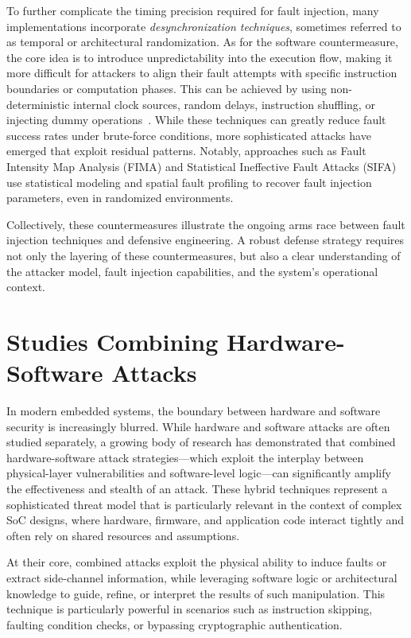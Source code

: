 To further complicate the timing precision required for fault injection, many implementations incorporate \textit{desynchronization techniques}, sometimes referred to as temporal or architectural randomization. As for the software countermeasure, the core idea is to introduce unpredictability into the execution flow, making it more difficult for attackers to align their fault attempts with specific instruction boundaries or computation phases. This can be achieved by using non-deterministic internal clock sources, random delays, instruction shuffling, or injecting dummy operations~\cite{patrick2017lightweight, wang2016against}. While these techniques can greatly reduce fault success rates under brute-force conditions, more sophisticated attacks have emerged that exploit residual patterns. Notably, approaches such as Fault Intensity Map Analysis (FIMA) \cite{ramezanpour2019fima} and Statistical Ineffective Fault Attacks (SIFA) \cite{dobraunig2018statistical} use statistical modeling and spatial fault profiling to recover fault injection parameters, even in randomized environments.

Collectively, these countermeasures illustrate the ongoing arms race between fault injection techniques and defensive engineering. A robust defense strategy requires not only the layering of these countermeasures, but also a clear understanding of the attacker model, fault injection capabilities, and the system’s operational context.

\section{Studies Combining Hardware-Software Attacks}
In modern embedded systems, the boundary between hardware and software security is increasingly blurred. While hardware and software attacks are often studied separately, a growing body of research has demonstrated that combined hardware-software attack strategies—which exploit the interplay between physical-layer vulnerabilities and software-level logic—can significantly amplify the effectiveness and stealth of an attack. These hybrid techniques represent a sophisticated threat model that is particularly relevant in the context of complex SoC designs, where hardware, firmware, and application code interact tightly and often rely on shared resources and assumptions.

At their core, combined attacks exploit the physical ability to induce faults or extract side-channel information, while leveraging software logic or architectural knowledge to guide, refine, or interpret the results of such manipulation. This technique is particularly powerful in scenarios such as instruction skipping, faulting condition checks, or bypassing cryptographic authentication.

